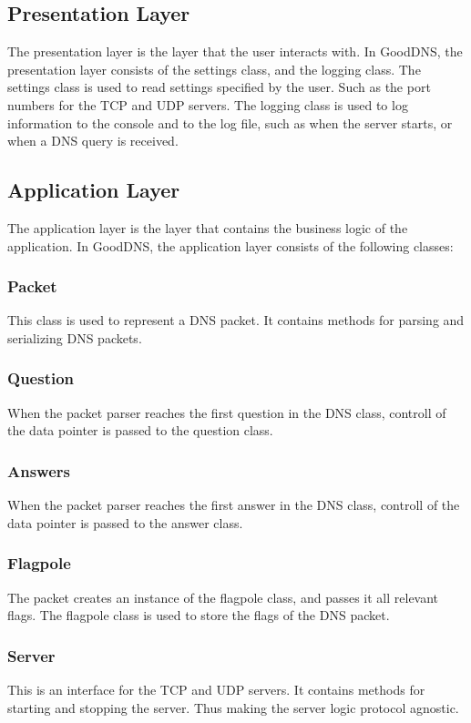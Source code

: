 \documentclass[12pt]{article}
\begin{document}
    \subsection{Presentation Layer}
    The presentation layer is the layer that the user interacts with. In GoodDNS, the presentation layer consists of the settings class,
    and the logging class. The settings class is used to read settings specified by the user. Such as the port numbers for the TCP and UDP servers.
    The logging class is used to log information to the console and to the log file, such as when the server starts, or when a DNS query is received.

    \subsection{Application Layer}
    The application layer is the layer that contains the business logic of the application. In GoodDNS, 
    the application layer consists of the following classes:

    \subsubsection{Packet}
    This class is used to represent a DNS packet. It contains methods for parsing and serializing DNS packets.
    \subsubsection{Question}
    When the packet parser reaches the first question in the DNS class, controll of the data pointer is passed to the question class.
    \subsubsection{Answers}
    When the packet parser reaches the first answer in the DNS class, controll of the data pointer is passed to the answer class.
    \subsubsection{Flagpole}
    The packet creates an instance of the flagpole class, and passes it all relevant flags. 
    The flagpole class is used to store the flags of the DNS packet.
    \subsubsection{Server}
    This is an interface for the TCP and UDP servers. It contains methods for starting and stopping the server. 
    Thus making the server logic protocol agnostic.
\end{document}
